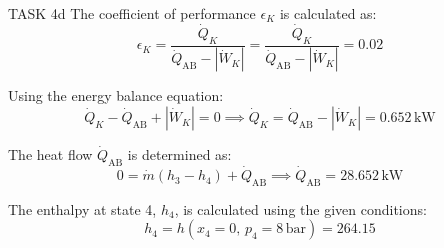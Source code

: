 TASK 4d  
The coefficient of performance \( \epsilon_K \) is calculated as:  
\[
\epsilon_K = \frac{\dot{Q}_K}{\dot{Q}_{\text{AB}} - |\dot{W}_K|} = \frac{\dot{Q}_K}{\dot{Q}_{\text{AB}} - |\dot{W}_K|} = 0.02
\]

Using the energy balance equation:  
\[
\dot{Q}_K - \dot{Q}_{\text{AB}} + |\dot{W}_K| = 0 \implies \dot{Q}_K = \dot{Q}_{\text{AB}} - |\dot{W}_K| = 0.652 \, \text{kW}
\]

The heat flow \( \dot{Q}_{\text{AB}} \) is determined as:  
\[
0 = \dot{m} \left( h_3 - h_4 \right) + \dot{Q}_{\text{AB}} \implies \dot{Q}_{\text{AB}} = 28.652 \, \text{kW}
\]

The enthalpy at state 4, \( h_4 \), is calculated using the given conditions:  
\[
h_4 = h \left( x_4 = 0, \, p_4 = 8 \, \text{bar} \right) = 264.15
\]